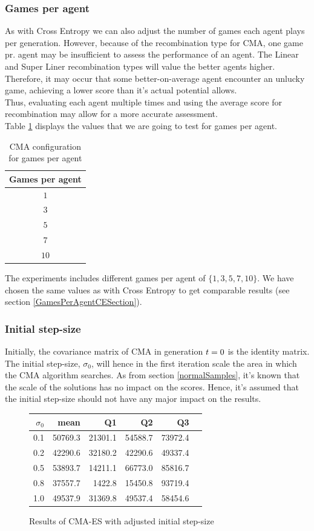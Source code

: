 \subsubsection{Games per agent \label{CMAGamesPerAgentSection}}
As with Cross Entropy we can also adjust the number of games each agent plays per generation.
However, because of the recombination type for CMA, one game pr. agent may  be insufficient to assess the
performance of an agent. The Linear and Super Liner recombination types will value the better agents higher.
Therefore, it may occur that some better-on-average agent encounter an unlucky game, achieving a lower score than
it's actual potential allows. \\
Thus, evaluating each agent multiple times and using the average score for recombination may allow for a more accurate assessment.\\
Table \ref{CMAGamesPerAgent} displays the values that we are going
to test for games per agent.

\begin{table}[h]
\centering
\begin{tabular}{c}
Games per agent\\
\hline
$1$\\
$3$\\
$5$\\
$7$\\
$10$
\end{tabular}
\caption{CMA configuration for games per agent \label{CMAGamesPerAgent}}
\end{table}

The experiments includes different games per agent of $\{1,3,5,7,10\}$. We have chosen the same 
values as with Cross Entropy to get comparable results (see section \ref{GamesPerAgentCESection}).

\subsubsection{Initial step-size}
Initially, the covariance matrix of CMA in generation $t = 0$
is the identity matrix. The initial step-size, $\sigma_0$, will hence in 
the first iteration scale the area in which the CMA algorithm searches.
As from section \ref{normalSamples}, it's known that the scale of the 
solutions has no impact on the scores. Hence, it's assumed that the initial 
step-size should not have any major impact on the results.

\begin{figure}[H]
\centering
\begin{tabular}{r | r r r r r}
$\sigma_0$ & mean & Q1 & Q2 & Q3\\
\hline
0.1 & 50769.3 & 21301.1 & 54588.7 & 73972.4\\
0.2 & 42290.6 & 32180.2 & 42290.6 & 49337.4\\
0.5 & 53893.7 & 14211.1 & 66773.0 & 85816.7\\
0.8 & 37557.7 & 1422.8  & 15450.8 & 93719.4\\
1.0 & 49537.9 & 31369.8 & 49537.4 & 58454.6
\end{tabular}
\caption{Results of CMA-ES with adjusted initial step-size \label{CMAInitialSigmaConfigTest}}
\end{figure}

